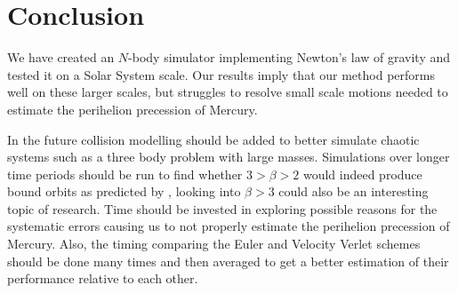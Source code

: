 \documentclass[twocolumn]{aastex62}
\begin{document}
\section{Conclusion} \label{sec:conclusion}
We have created an $N$-body simulator implementing Newton's law of 
gravity and tested it on a Solar System scale. Our results imply 
that our method performs well on these larger scales, but struggles to 
resolve small scale motions needed to estimate the perihelion precession 
of Mercury.

In the future collision modelling should be added to better simulate 
chaotic systems such as a three body problem with large masses.
Simulations over longer time periods should be run to find whether $3>\beta>2$ would indeed produce bound orbits as predicted by \citep{ray:2004}, looking into $\beta>3$ could also be an interesting topic of research.
Time should be invested in exploring possible reasons for the systematic 
errors causing us to not properly estimate the perihelion precession 
of Mercury. Also, the timing comparing the Euler and Velocity Verlet 
schemes should be done many times and then averaged to get a better 
estimation of their performance relative to each other.
\newpage


\end{document}

